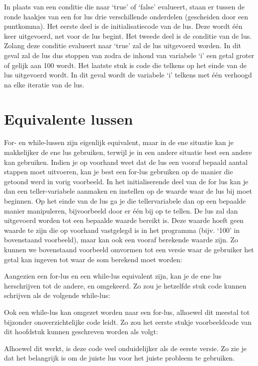 
In plaats van een conditie die naar `true' of `false' evalueert, staan er tussen de ronde haakjes van een for lus drie verschillende onderdelen (gescheiden door een puntkomma). Het eerste deel is de initialisatiecode van de lus. Deze wordt \'e\'en keer uitgevoerd, net voor de lus begint. Het tweede deel is de conditie van de lus. Zolang deze conditie evalueert naar `true' zal de lus uitgevoerd worden. In dit geval zal de lus dus stoppen van zodra de inhoud van variabele `i' een getal groter of gelijk aan 100 wordt. Het laatste stuk is code die telkens op het einde van de lus uitgevoerd wordt. In dit geval  wordt de variabele `i' telkens met \'e\'en verhoogd na elke iteratie van de lus.

\section{Equivalente lussen}

For- en while-lussen zijn eigenlijk equivalent, maar in de ene situatie kan je makkelijker de ene lus gebruiken, terwijl je in een andere situatie best een andere kan gebruiken. Indien je op voorhand weet dat de lus een vooraf bepaald aantal stappen moet uitvoeren, kan je best een for-lus gebruiken op de manier die getoond werd in vorig voorbeeld. In het initialiserende deel van de for lus kan je dan een teller-variabele aanmaken en instellen op de waarde waar de lus bij moet beginnen. Op het einde van de lus ga je die tellervariabele dan op een bepaalde manier manipuleren, bijvoorbeeld door er \'e\'en bij op te tellen. De lus zal dan uitgevoerd worden tot een bepaalde waarde bereikt is. Deze waarde hoeft geen waarde te zijn die op voorhand vastgelegd is in het programma (bijv. `100' in bovenstaand voorbeeld), maar kan ook een vooraf berekende waarde zijn. Zo kunnen we bovenstaand voorbeeld omvormen tot een versie waar de gebruiker het getal kan ingeven tot waar de som berekend moet worden:


Aangezien een for-lus en een while-lus equivalent zijn, kan je de ene lus herschrijven tot de andere, en omgekeerd. Zo zou je hetzelfde stuk code kunnen schrijven als de volgende while-lus:


Ook een while-lus kan omgezet worden naar een for-lus, alhoewel dit meestal tot bijzonder onoverzichtelijke code leidt. Zo zou het eerste stukje voorbeeldcode van dit hoofdstuk kunnen geschreven worden als volgt:


Alhoewel dit werkt, is deze code veel onduidelijker als de eerste versie. Zo zie je dat het belangrijk is om de juiste lus voor het juiste probleem te gebruiken. 

